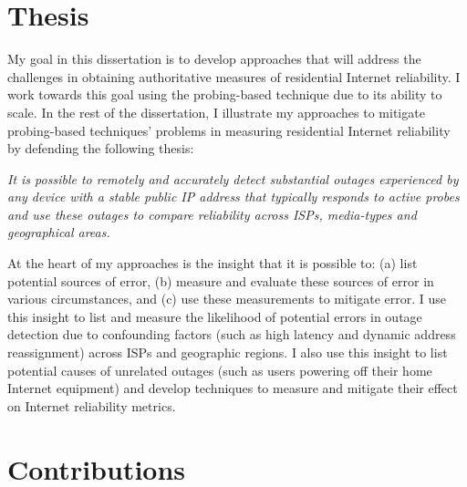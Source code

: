 
\section{Thesis}


My goal in this dissertation is to develop approaches that will
address the challenges in obtaining authoritative measures of
residential Internet reliability. I work towards this goal using the
probing-based technique due to its ability to scale. In the rest of
the dissertation, I illustrate my approaches to mitigate probing-based
techniques' problems in measuring residential Internet reliability
by defending the following thesis:

\emph{It is possible to remotely and accurately detect substantial outages
  experienced by any device with a stable public IP address that typically
  responds to active probes and use these outages to compare
  reliability across ISPs, media-types and geographical areas.} 


At the heart of my approaches is the insight that it is possible to: (a) list
potential sources of error, (b) measure and evaluate these sources of
error in various circumstances, and (c) use these
measurements to mitigate error. I use this insight to list and
measure the likelihood of potential errors in outage detection due
to confounding factors (such as high latency and dynamic address reassignment) across ISPs and
geographic regions. I also use this insight to list potential causes
of unrelated outages (such as users powering off their
home Internet equipment) and develop techniques to 
measure and mitigate their effect on Internet reliability metrics. %


\section{Contributions}

